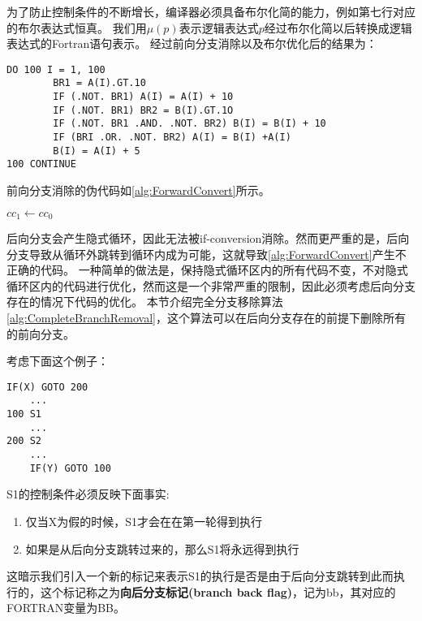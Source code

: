 为了防止控制条件的不断增长，编译器必须具备布尔化简的能力，例如第七行对应的布尔表达式恒真。
我们用$\mu\left(p\right)$表示逻辑表达式$p$经过布尔化简以后转换成逻辑表达式的Fortran语句表示。
经过前向分支消除以及布尔优化后的结果为：

\begin{lstlisting}[language=FORTRAN]
	DO 100 I = 1, 100
		BR1 = A(I).GT.10
		IF (.NOT. BR1) A(I) = A(I) + 10
		IF (.NOT. BR1) BR2 = B(I).GT.1O
		IF (.NOT. BR1 .AND. .NOT. BR2) B(I) = B(I) + 10
		IF (BRI .OR. .NOT. BR2) A(I) = B(I) +A(I)
		B(I) = A(I) + 5
100	CONTINUE
\end{lstlisting}
前向分支消除的伪代码如\ref{alg:ForwardConvert}所示。

\begin{algorithm}[H]
	\label{alg:ForwardConvert}
	\caption{$forward\_convert\left(x,cc_0\right)$}
	$cc_1\leftarrow cc_0$\;
\end{algorithm}

后向分支会产生隐式循环，因此无法被if-conversion消除。然而更严重的是，后向分支导致从循环外跳转到循环内成为可能，这就导致\ref{alg:ForwardConvert}产生不正确的代码。
一种简单的做法是，保持隐式循环区内的所有代码不变，不对隐式循环区内的代码进行优化，然而这是一个非常严重的限制，因此必须考虑后向分支存在的情况下代码的优化。
本节介绍完全分支移除算法\ref{alg:CompleteBranchRemoval}，这个算法可以在后向分支存在的前提下删除所有的前向分支。

考虑下面这个例子：
\begin{lstlisting}[language=FORTRAN]
	IF(X) GOTO 200
	...
100	S1
	...
200	S2
	...
	IF(Y) GOTO 100
\end{lstlisting}

S1的控制条件必须反映下面事实:
\begin{enumerate}
\item 仅当X为假的时候，S1才会在在第一轮得到执行
\item 如果是从后向分支跳转过来的，那么S1将永远得到执行
\end{enumerate}
这暗示我们引入一个新的标记来表示S1的执行是否是由于后向分支跳转到此而执行的，这个标记称之为\textbf{向后分支标记(branch back flag)}，记为bb，其对应的FORTRAN变量为BB。

